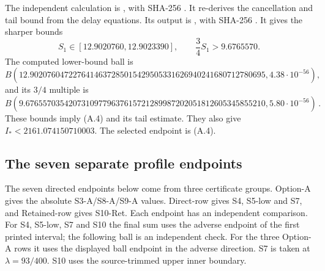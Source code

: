 {The independent calculation is , with SHA-256
.
It re-derives the cancellation and tail bound from the delay equations.
Its output is , with SHA-256
.
It gives the sharper bounds
\[
 S_1\in[12.9020760,12.9023390],\qquad
 \frac34S_1>9.6765570.                                 \tag{A.5a}
\]
The computed lower-bound ball is
{\normalsize
\[
B(12.9020760472276414637285015429505331626940241680712780695,
4.38\cdot10^{-56})\mathpunct{,}
\]
and its $3/4$ multiple is
\[
B(9.67655703542073109779637615721289987202051812605345855210,
5.80\cdot10^{-56})\mathpunct{.}
\]
}
These bounds imply (A.4) and its tail estimate.
They also give $I_*<2161.074150710003$.
The selected endpoint is (A.4).

\subsection{The seven separate profile endpoints}

The seven directed endpoints below come from three certificate groups.
Option-A gives the absolute S3-A/S8-A/S9-A values.
Direct-row gives S4, S5-low and S7,
and Retained-row gives S10-Ret.
Each endpoint has an independent comparison.
For S4, S5-low, S7 and S10 the final sum uses the adverse endpoint of the
first printed interval; the following ball is an independent check.
For the three Option-A rows it uses the displayed ball endpoint in the
adverse direction.
S7 is taken at $\lambda=93/400$.
S10 uses the source-trimmed upper inner boundary.

}
